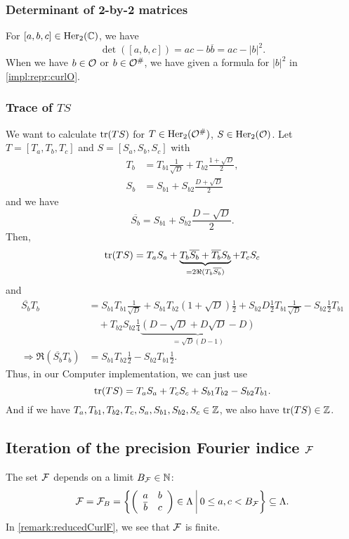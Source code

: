 \subsubsection{Determinant of 2-by-2 matrices}

For $[a,b,c] \in \operatorname{Her}_2(\mathbb{C})$, we have
\[ \det([a,b,c]) = ac - b \overline{b} = ac - |b|^2 . \]
%
When we have $b \in \mathcal{O}$ or $b \in \mathcal{O}^\#$, we have given a formula for $|b|^2$ in \cref{impl:repr:curlO}.

\subsubsection{Trace of $TS$}
We want to calculate $\textup{\textrm{tr}}(TS)$ for $T \in \operatorname{Her}_2(\mathcal{O}^\#)$, $S \in \operatorname{Her}_2(\mathcal{O})$.
Let $T = [T_a, T_b, T_c]$ and $S = [S_a, S_b, S_c]$ with
\begin{align*}
T_b &= T_{b1} \frac{1}{\sqrt{D}} + T_{b2} \frac{1 + \sqrt{D}} {2} , \\
S_b &= S_{b1} + S_{b2} \frac{D + \sqrt{D}} {2}
\end{align*}
and we have
\[ \overline{S_b} = S_{b1} + S_{b2} \frac{D - \sqrt{D}} {2} . \]
Then,
\[
\textup{\textrm{tr}}(T S) = T_a S_a
+ \underbrace{T_b \overline{S_b} + \overline{T_b} S_b}_{= 2 \Re(T_b \overline{S_b})}
+ T_c S_c
\]
and
\begin{align*}
\overline{S_b} T_b &= S_{b1} T_{b1} \tfrac{1}{\sqrt{D}} + S_{b1} T_{b2} (1 + \sqrt{D}) \tfrac{1}{2}
+ S_{b2} D \tfrac{1}{2} T_{b1} \tfrac{1}{\sqrt{D}}
- S_{b2} \tfrac{1}{2} T_{b1} \\
&\quad + T_{b2} S_{b2} \tfrac{1}{4} \underbrace{(D - \sqrt{D} + D \sqrt{D} - D)}_{=\sqrt{D}(D-1)} \\
\Rightarrow \Re(\overline{S_b} T_b) &= S_{b1} T_{b2} \tfrac{1}{2} - S_{b2} T_{b1} \tfrac{1}{2} .
\end{align*}
Thus, in our Computer implementation, we can just use
\[ \textup{\textrm{tr}}(T S) = T_a S_a + T_c S_c + S_{b1} T_{b2} - S_{b2} T_{b1} . \]
And if we have $T_a, T_{b1}, T_{b2}, T_{c}, S_a, S_{b1}, S_{b2}, S_c \in \mathbb{Z}$, we also have $\textup{\textrm{tr}}(TS) \in \mathbb{Z}$.


\subsection{Iteration of the precision Fourier indice $\mathcal{F}$}

The set $\mathcal{F}$ depends on a limit $B_{\mathcal{F}} \in \mathbb{N}$:
\[ \F = \F_B = \Set{\SimpleMatrix{a}{b}{\overline b}{c} \in \Lambda}{0 \le a , c < B_{\F}} \subseteq \Lambda . \]
In \cref{remark:reducedCurlF}, we see that $\mathcal{F}$ is finite.

